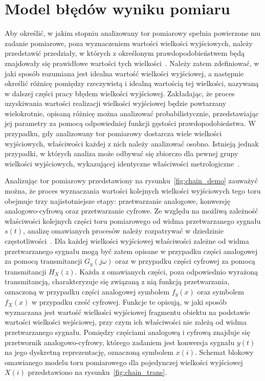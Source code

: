 \chapter{Model błędów wyniku pomiaru}

Aby określić, w jakim stopniu analizowany tor pomiarowy spełnia powierzone mu zadanie pomiarowe, poza wyznaczeniem wartości wielkości wyjściowych, należy przedstawić przedziały, w których z określonym prawdopodobieństwem będą znajdowały się prawidłowe wartości tych wielkości~\cite{jcgm_guide}. Należy zatem zdefiniować, w jaki sposób rozumiana jest idealna wartość wielkości wyjściowej, a następnie określić różnicę pomiędzy rzeczywistą i idealną wartością tej wielkości, nazywaną w dalszej części pracy błędem wielkości wyjściowej. Zakładając, że proces uzyskiwania wartości realizacji wielkości wyjściowej będzie powtarzany wielokrotnie, opisaną różnicę można analizować probabilistycznie, przedstawiając jej parametry za pomocą odpowiedniej funkcji gęstości prawdopodobieństwa. W przypadku, gdy analizowany tor pomiarowy dostarcza wiele wielkości wyjściowych, właściwości każdej z nich należy analizować osobno. Istnieją jednak przypadki, w których analiza może odbywać się zbiorczo dla pewnej grupy wielkości wyjściowych, wykazującej identyczne właściwości metrologiczne~\cite{auth_random}.

Analizując tor pomiarowy przedstawiony na rysunku~\ref{fig:chain_demo} zauważyć można, że proces wyznaczania wartości kolejnych wielkości wyjściowych tego toru obejmuje trzy najistotniejsze etapy: przetwarzanie analogowe, konwersję analogowo-cyfrową oraz przetwarzanie cyfrowe. Ze względu na możliwą zależność właściwości kolejnych części toru pomiarowego od widma przetwarzanego sygnału $s(t)$, analizę omawianych procesów należy rozpatrywać w dziedzinie częstotliwości~\cite{jakubiec_system}. Dla każdej wielkości wyjściowej właściwości zależne od widma przetwarzanego sygnału mogą być zatem opisane w przypadku części analogowej za pomocą transmitancji $G_{y}(j\omega)$ oraz w przypadku części cyfrowej za pomocą transmitancji $H_{X}(z)$. Każda z omawianych części, poza odpowiednio wyrażoną transmitancją, charakteryzuje się związaną z nią funkcją przetwarzania, oznaczoną w przypadku części analogowej symbolem $f_{y}(x)$ oraz symbolem $f_{X}(x)$ w przypadku cześć cyfrowej. Funkcje te opisują, w jaki sposób wyznaczana jest wartość wielkości wyjściowej fragmentu obiektu na podstawie wartości wielkości wejściowej, przy czym ich właściwości nie zależą od widma przetwarzanego sygnału. Pomiędzy częściami analogową i cyfrową znajduje się przetwornik analogowo-cyfrowy, którego zadaniem jest konwersja sygnału $y(t)$ na jego dyskretną reprezentację, oznaczoną symbolem $x(i)$. Schemat blokowy omawianego modelu toru pomiarowego dla pojedynczej wielkości wyjściowej $X(i)$ przedstawiono na rysunku~\ref{fig:chain_trans}.

